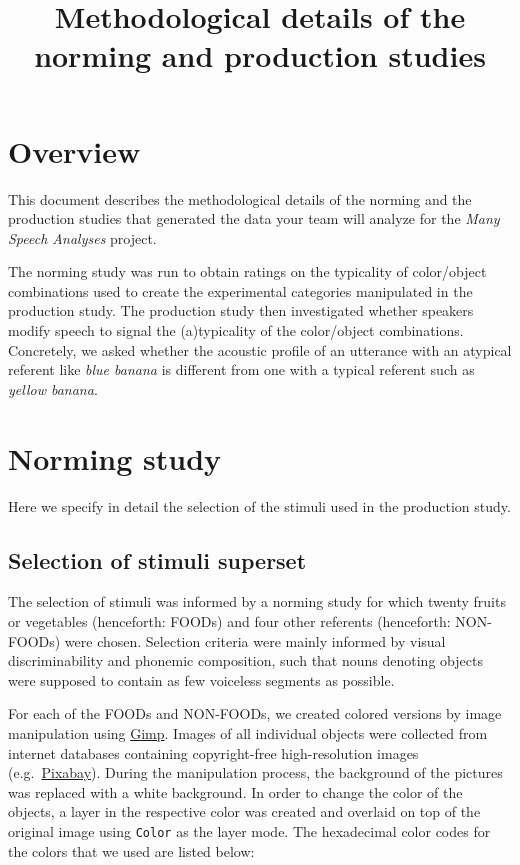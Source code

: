 \documentclass[
  12pt,
]{article}
\title{Methodological details of the norming and production studies}
\author{}
\date{\vspace{-2.5em}}
\begin{document}
\maketitle

{
\setcounter{tocdepth}{2}
\tableofcontents
}
\hypertarget{overview}{%
\section{Overview}\label{overview}}

This document describes the methodological details of the norming and the production studies that generated the data your team will analyze for the \emph{Many Speech Analyses} project.

The norming study was run to obtain ratings on the typicality of color/object combinations used to create the experimental categories manipulated in the production study.
The production study then investigated whether speakers modify speech to signal the (a)typicality of the color/object combinations.
Concretely, we asked whether the acoustic profile of an utterance with an atypical referent like \emph{blue banana} is different from one with a typical referent such as \emph{yellow banana}.

\hypertarget{norming-study}{%
\section{Norming study}\label{norming-study}}

Here we specify in detail the selection of the stimuli used in the production study.

\hypertarget{selection-of-stimuli-superset}{%
\subsection{Selection of stimuli superset}\label{selection-of-stimuli-superset}}

The selection of stimuli was informed by a norming study for which twenty fruits or vegetables (henceforth: FOODs) and four other referents (henceforth: NON-FOODs) were chosen.
Selection criteria were mainly informed by visual discriminability and phonemic composition, such that nouns denoting objects were supposed to contain as few voiceless segments as possible.

For each of the FOODs and NON-FOODs, we created colored versions by image manipulation using \href{http://www.gimp.org}{Gimp}.
Images of all individual objects were collected from internet databases containing copyright-free high-resolution images (e.g.~\href{https://pixabay.com}{Pixabay}).
During the manipulation process, the background of the pictures was replaced with a white background.
In order to change the color of the objects, a layer in the respective color was created and overlaid on top of the original image using \texttt{Color} as the layer mode.
The hexadecimal color codes for the colors that we used are listed below:
\end{document}
